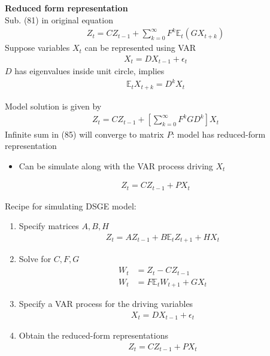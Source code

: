 \documentclass{beamer}
\begin{document}
\begin{frame}
  \textbf{Reduced form representation}\\
  Sub. (81) in original equation
  \begin{align}
    Z_t= CZ_{t-1} + \sum^{\infty}_{k=0} F^k\mathbb{E}_t(GX_{t+k})
  \end{align}
  \medskip
  Suppose variables $X_t$ can be represented using VAR
  \begin{align}
    X_t=DX_{t-1} + \epsilon_t
  \end{align}
  \medskip
  $D$ has eigenvalues inside unit circle, implies
  \begin{align}
    \mathbb{E}_t X_{t+k}=D^k X_t
  \end{align}  
\end{frame}

\begin{frame}
Model solution is given by
  \begin{align}
    Z_t= CZ_{t-1} + \left[ \sum^{\infty}_{k=0}F^k GD^k \right]X_t  
  \end{align}
  Infinite sum in (85) will converge to matrix $P$: model has reduced-form representation 
  \begin{itemize}
    \item Can be simulate along with the VAR process driving $X_t$
  \end{itemize}
\begin{align}
  Z_t= CZ_{t-1} + PX_t
\end{align} 
\end{frame}

\begin{frame}
  Recipe for simulating DSGE model:
\begin{enumerate}
  \item Specify matrices $A,B,H$
  \begin{align*}
    Z_t=AZ_{t-1} + B\mathbb{E}_t Z_{t+1} + HX_t 
  \end{align*}
  \item Solve for $C,F,G$
  \begin{align*}
    W_t&=Z_t - CZ_{t-1}\\
   W_t&=F\mathbb{E}_t W_{t+1} + GX_t  
  \end{align*}
  \item Specify a VAR process for the driving variables
  \begin{align*}
    X_t=DX_{t-1} + \epsilon_t
  \end{align*}
  \item Obtain the reduced-form representations  
  \begin{align*}
    Z_t= CZ_{t-1} + PX_t
  \end{align*}
\end{enumerate}
\end{frame}
\end{document}
